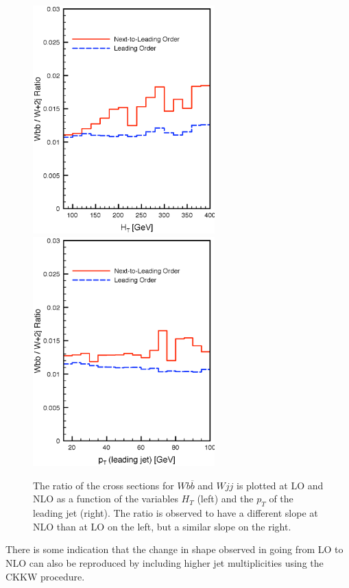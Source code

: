 \documentclass[12pt]{iopart}
\begin{document}
\begin{figure}
\begin{center}
\includegraphics[width=7cm]{htratio.eps}
\includegraphics[width=7cm]{pt5ratio.eps}
\end{center}
\caption{
The ratio of the cross sections for $Wb\overline{b}$ and $Wjj$ is plotted at LO and NLO as a function of the variables $H_T$ (left)
and the $p_T$ of the leading jet (right). The ratio is observed to have a different slope at NLO than at LO on the left, but a similar
slope on the right.
\label{fig:htpt5ratios}}
\end{figure}
There is some indication that the change in shape observed in going from LO to NLO can also be reproduced by including higher
jet multiplicities using the CKKW procedure. 


\end{document}
